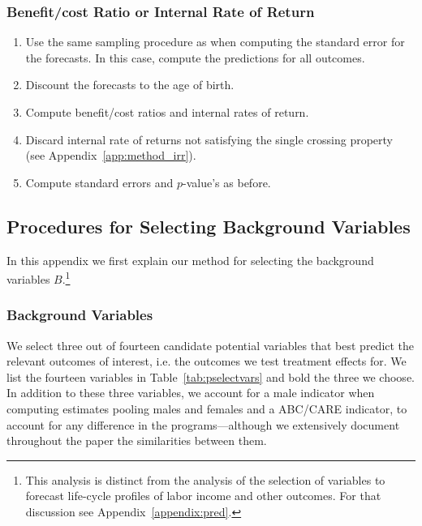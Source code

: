 \subsubsection{Benefit/cost Ratio or Internal Rate of Return}

\begin{enumerate}

\item Use the same sampling procedure as when computing the standard error for the forecasts. In this case, compute the predictions for all outcomes.
\item Discount the forecasts to the age of birth.
\item Compute benefit/cost ratios and internal rates of return.
\item Discard internal rate of returns not satisfying the single crossing property (see Appendix~\ref{app:method_irr}).
\item Compute standard errors and $p$-value's as before.

\end{enumerate}


\subsection{Procedures for Selecting Background Variables} \label{appendix:results}

\noindent In this appendix we first explain our method for selecting the background variables $B$.\footnote{This analysis is distinct from the analysis of the selection of variables to forecast life-cycle profiles of labor income and other outcomes. For that discussion see Appendix~\ref{appendix:pred}.}

\subsubsection{Background Variables} \label{appendix:bvariables}

\noindent We select three out of fourteen candidate potential variables that best predict the relevant outcomes of interest, i.e. the outcomes we test treatment effects for. We list the fourteen variables in Table~\ref{tab:pselectvars} and bold the three we choose. In addition to these three variables, we account for a male indicator when computing estimates pooling males and females and a ABC/CARE indicator, to account for any difference in the programs---although we extensively document throughout the paper the similarities between them.

